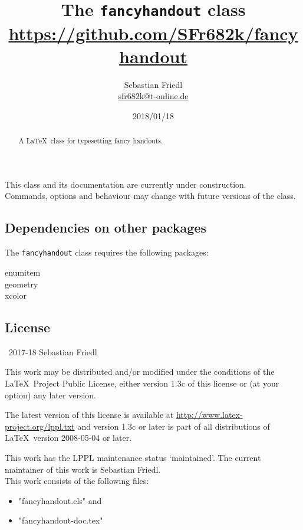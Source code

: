 \documentclass[11pt]{ltxdoc}
\title{The \texttt{fancyhandout} class \\ {\large\url{https://github.com/SFr682k/fancyhandout}}}
\author{Sebastian Friedl \\ \href{mailto:sfr682k@t-online.de}{\ttfamily sfr682k@t-online.de}}
\date{2018/01/18}
\begin{document}
	\maketitle
	
	\begin{abstract}
		\noindent%
		A \LaTeX\ class for typesetting fancy handouts.
	\end{abstract}
	
	This class and its documentation are currently under construction. \\
	Commands, options and behaviour may change with future versions of the class.
	
	\tableofcontents
	\clearpage
	
	
	
	\subsection*{Dependencies on other packages}
	The \texttt{fancyhandout} class requires the following packages:
	\begin{multicols}{3}\ttfamily\centering
		enumitem \\ geometry \\ xcolor
	\end{multicols}
	
	\subsection*{License}
	\textcopyright\ 2017-18 Sebastian Friedl
	
	\smallskip
	This work may be distributed and/or modified under the conditions of the \LaTeX\ Project Public License, either version 1.3c of this license or (at your option) any later version.
	
	\smallskip
	The latest version of this license is available at \url{http://www.latex-project.org/lppl.txt} and version 1.3c or later is part of all distributions of \LaTeX\ version 2008-05-04 or later.
	
	\smallskip
	This work has the LPPL maintenance status \enquote*{maintained}. The current maintainer of this work is Sebastian Friedl. \\
	This work consists of the following files:
	\begin{itemize} \itemsep 0pt
		\item "fancyhandout.cls" and
		\item "fancyhandout-doc.tex"
	\end{itemize}
\end{document}
